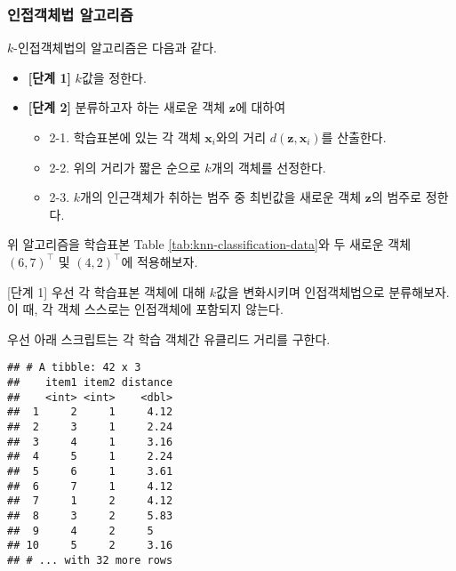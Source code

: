 \documentclass[]{book}
\newenvironment{Shaded}{\begin{snugshade}}{\end{snugshade}}
\newcommand{\DataTypeTok}[1]{\textcolor[rgb]{0.13,0.29,0.53}{#1}}
\newcommand{\KeywordTok}[1]{\textcolor[rgb]{0.13,0.29,0.53}{\textbf{#1}}}
\newcommand{\NormalTok}[1]{#1}
\newcommand{\OperatorTok}[1]{\textcolor[rgb]{0.81,0.36,0.00}{\textbf{#1}}}
\newcommand{\OtherTok}[1]{\textcolor[rgb]{0.56,0.35,0.01}{#1}}
\newcommand{\StringTok}[1]{\textcolor[rgb]{0.31,0.60,0.02}{#1}}
\providecommand{\tightlist}{%
  \setlength{\itemsep}{0pt}\setlength{\parskip}{0pt}}
\begin{document}
\hypertarget{nearest-neighbor-classification-algorithm}{%
\subsubsection{인접객체법 알고리즘}\label{nearest-neighbor-classification-algorithm}}

\(k\)-인접객체법의 알고리즘은 다음과 같다.

\begin{itemize}
\tightlist
\item
  \textbf{{[}단계 1{]}} \(k\)값을 정한다.
\item
  \textbf{{[}단계 2{]}} 분류하고자 하는 새로운 객체 \(\mathbf{z}\)에 대하여

  \begin{itemize}
  \tightlist
  \item
    2-1. 학습표본에 있는 각 객체 \(\mathbf{x}_i\)와의 거리 \(d(\mathbf{z}, \mathbf{x}_i)\)를 산출한다.
  \item
    2-2. 위의 거리가 짧은 순으로 \(k\)개의 객체를 선정한다.
  \item
    2-3. \(k\)개의 인근객체가 취하는 범주 중 최빈값을 새로운 객체 \(\mathbf{z}\)의 범주로 정한다.
  \end{itemize}
\end{itemize}

위 알고리즘을 학습표본 Table \ref{tab:knn-classification-data}와 두 새로운 객체 \((6, 7)^\top\) 및 \((4, 2)^\top\)에 적용해보자.

{[}단계 1{]} 우선 각 학습표본 객체에 대해 \(k\)값을 변화시키며 인접객체법으로 분류해보자. 이 때, 각 객체 스스로는 인접객체에 포함되지 않는다.

우선 아래 스크립트는 각 학습 객체간 유클리드 거리를 구한다.

\begin{Shaded}
\end{Shaded}

\begin{verbatim}
## # A tibble: 42 x 3
##    item1 item2 distance
##    <int> <int>    <dbl>
##  1     2     1     4.12
##  2     3     1     2.24
##  3     4     1     3.16
##  4     5     1     2.24
##  5     6     1     3.61
##  6     7     1     4.12
##  7     1     2     4.12
##  8     3     2     5.83
##  9     4     2     5   
## 10     5     2     3.16
## # ... with 32 more rows
\end{verbatim}
\end{document}
